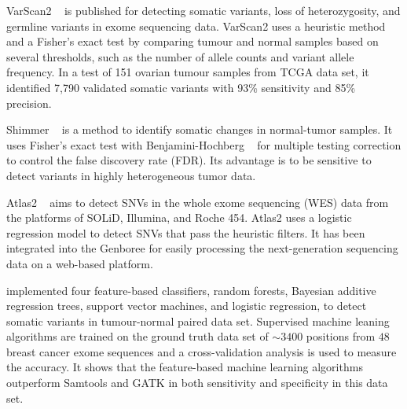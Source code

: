 \documentclass[11pt,reqno]{amsart}
\begin{document}
VarScan2 ~\citep{Koboldt2012} is published for detecting somatic variants, loss of heterozygosity, and germline variants in exome sequencing data.
VarScan2 uses a heuristic method and a Fisher's exact test by comparing tumour and normal samples based on several thresholds, such as the number of allele counts and variant allele frequency.
In a test of 151 ovarian tumour samples from TCGA data set, it identified 7,790 validated somatic variants with 93\% sensitivity and 85\% precision.

Shimmer ~\citep{Hansen2013} is a method to identify somatic changes in normal-tumor samples.
It uses Fisher's exact test with Benjamini-Hochberg ~\citep{benjamini1995controlling} for multiple testing correction to control the false discovery rate (FDR).
Its advantage is to be sensitive to detect variants in highly heterogeneous tumor data.

Atlas2 ~\citep{challis2012integrative} aims to detect SNVs in the whole exome sequencing (WES) data from the platforms of SOLiD, Illumina, and Roche 454.
Atlas2 uses a logistic regression model to detect SNVs that pass the heuristic filters.
It has been integrated into the Genboree for easily processing the next-generation sequencing data on a web-based platform.


\citet{Ding2012} implemented four feature-based classifiers, random forests, Bayesian additive regression trees, support vector machines, and logistic regression, to detect somatic variants in tumour-normal paired data set.
Supervised machine leaning algorithms are trained on the ground truth data set of $\sim 3400$ positions from $48$ breast cancer exome sequences and a cross-validation analysis is used to measure the accuracy.
It shows that the feature-based machine learning algorithms outperform Samtools and GATK in both sensitivity and specificity in this data set.




\end{document}
